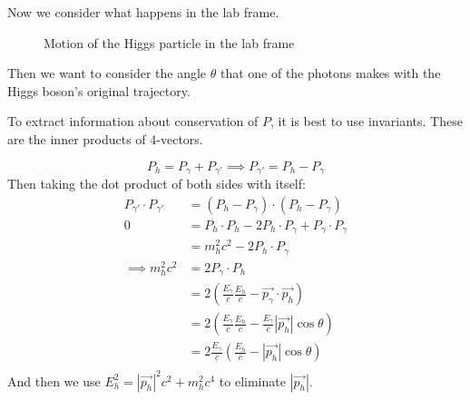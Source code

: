 \documentclass[../Main.tex]{subfiles}
\begin{document}
Now we consider what happens in the lab frame.
\begin{figure}[ht]
    \centering
    \caption{Motion of the Higgs particle in the lab frame}
    \label{figHiggsLab}
\end{figure}
Then we want to consider the angle $\theta$ that one of the photons makes with the Higgs boson's original trajectory.

To extract information about conservation of $P$, it is best to use invariants. These are the inner products of 4-vectors.

\begin{equation*}
    P_h = P_\gamma + P_{\gamma'} \implies P_{\gamma'} = P_h - P_\gamma
\end{equation*}
Then taking the dot product of both sides with itself:
\begin{align*}
    P_{\gamma'} \cdot P_{\gamma'} &= (P_h - P_\gamma) \cdot (P_h - P_\gamma) \\
    0 &= P_h \cdot P_h - 2 P_h \cdot P_\gamma + P_\gamma \cdot P_\gamma \\
    &= m_h^2 c^2 - 2P_h \cdot P_\gamma \\
    \implies m_h^2 c^2 &= 2P_\gamma \cdot P_h \\
    &= 2\left(\frac{E_\gamma}{c} \frac{E_h}{c} - \vec{p_\gamma} \cdot \vec{p_h}\right) \\
    &= 2\left(\frac{E_\gamma}{c} \frac{E_h}{c} - \frac{E_\gamma}{c} |\vec{p_h}|\cos{\theta}\right) \\
    &= 2\frac{E_\gamma}{c}\left(\frac{E_h}{c} - |\vec{p_h}|\cos{\theta}\right) \\
\end{align*}
And then we use $E_h^2 = |\vec{p_h}|^2 c^2 + m_h^2 c^4$ to eliminate $|\vec{p_h}|$.
\end{document}
